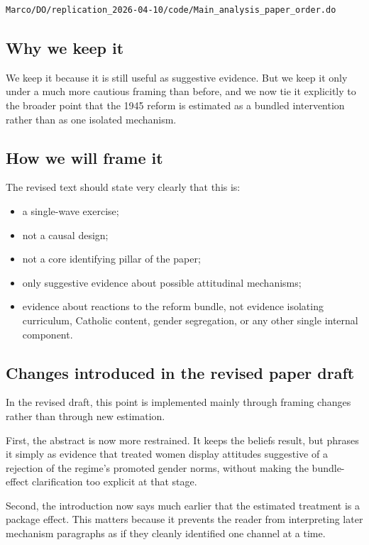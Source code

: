 \documentclass[11pt]{article}
\begin{document}
\begin{verbatim}
Marco/DO/replication_2026-04-10/code/Main_analysis_paper_order.do
\end{verbatim}

\subsection*{Why we keep it}

We keep it because it is still useful as suggestive evidence. But we keep it only under a much more cautious framing than before, and we now tie it explicitly to the broader point that the 1945 reform is estimated as a bundled intervention rather than as one isolated mechanism.

\subsection*{How we will frame it}

The revised text should state very clearly that this is:
\begin{itemize}[leftmargin=*]
\item a single-wave exercise;
\item not a causal design;
\item not a core identifying pillar of the paper;
\item only suggestive evidence about possible attitudinal mechanisms;
\item evidence about reactions to the reform bundle, not evidence isolating curriculum, Catholic content, gender segregation, or any other single internal component.
\end{itemize}

\subsection*{Changes introduced in the revised paper draft}

In the revised draft, this point is implemented mainly through framing changes rather than through new estimation.

First, the abstract is now more restrained. It keeps the beliefs result, but phrases it simply as evidence that treated women display attitudes suggestive of a rejection of the regime's promoted gender norms, without making the bundle-effect clarification too explicit at that stage.

Second, the introduction now says much earlier that the estimated treatment is a package effect. This matters because it prevents the reader from interpreting later mechanism paragraphs as if they cleanly identified one channel at a time.
\end{document}
